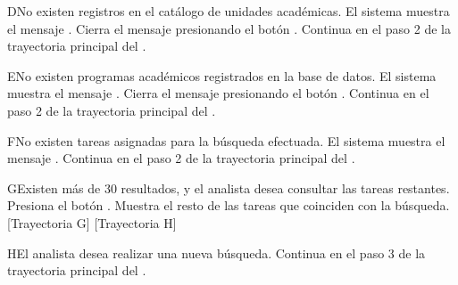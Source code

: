 
\begin{UCtrayectoriaA}{D}{No existen registros en el catálogo de unidades académicas.}
	\UCpaso El sistema muestra el mensaje .
	\UCpaso[\UCactor] Cierra el mensaje presionando el botón .
    \UCpaso Continua en el paso 2 de la trayectoria principal del .
\end{UCtrayectoriaA}


\begin{UCtrayectoriaA}{E}{No existen programas académicos registrados en la base de datos.}
	\UCpaso El sistema muestra el mensaje .
	\UCpaso[\UCactor] Cierra el mensaje presionando el botón .
    \UCpaso Continua en el paso 2 de la trayectoria principal del .
\end{UCtrayectoriaA}


\begin{UCtrayectoriaA}{F}{No existen tareas asignadas para la búsqueda efectuada.}
	\UCpaso El sistema muestra el mensaje .
    \UCpaso Continua en el paso 2 de la trayectoria principal del .
\end{UCtrayectoriaA}


\begin{UCtrayectoriaA}{G}{Existen más de 30 resultados, y el analista desea consultar las tareas restantes.}
	\UCpaso [\UCactor] Presiona el botón . 
    \UCpaso Muestra el resto de las tareas que coinciden con la búsqueda. [Trayectoria G] [Trayectoria H] 
\end{UCtrayectoriaA}


\begin{UCtrayectoriaA}{H}{El analista desea realizar una nueva búsqueda.}
    \UCpaso Continua en el paso 3 de la trayectoria principal del .
\end{UCtrayectoriaA}

